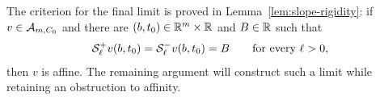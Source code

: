 The criterion for the final limit is proved in
Lemma~\ref{lem:slope-rigidity}: if $v\in\mathcal{A}_{m,C_0}$ and there are
$(b,t_0)\in\mathbb{R}^m\times\mathbb{R}$ and $B\in\mathbb{R}$ such that
\[
  \mathcal{S}_\ell^+v(b,t_0)=\mathcal{S}_\ell^-v(b,t_0)=B
       \qquad\text{for every }\ell>0,
\]
then $v$ is affine. The remaining argument will construct such a limit while
retaining an obstruction to affinity.
